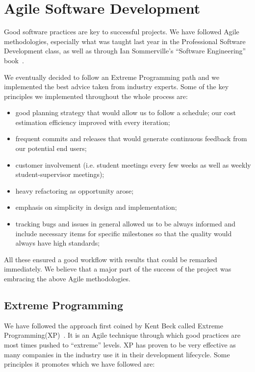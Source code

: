 \documentclass{l4proj}
\begin{document}

\chapter{Agile Software Development}
\label{agile-software-development}

Good software practices are key to successful projects. We have followed Agile methodologies, especially what was
taught last year in the Professional Software Development class, as well as through Ian Sommerville's ``Software
Engineering'' book~\cite{software-engineering}.

We eventually decided to follow an Extreme Programming path and we implemented the best advice taken from industry
experts. Some of the key principles we implemented throughout the whole process are:
\begin{itemize}
    \item good planning strategy that would allow us to follow a schedule; our cost estimation efficiency improved
      with every iteration;
    \item frequent commits and releases that would generate continuous feedback from our potential end users;
    \item customer involvement (i.e. student meetings every few weeks as well as weekly student-supervisor
      meetings);
    \item heavy refactoring as opportunity arose;
    \item emphasis on simplicity in design and implementation;
    \item tracking bugs and issues in general allowed us to be always informed and include necessary items for
      specific milestones so that the quality would always have high standards;
\end{itemize}

All these ensured a good workflow with results that could be remarked immediately. We believe that a major part of the
success of the project was embracing the above Agile methodologies.

\section{Extreme Programming}

We have followed the approach first coined by Kent Beck called Extreme Programming(XP)~\cite{extreme-programming}. It is an
Agile technique through which good practices are most times pushed to ``extreme'' levels. XP has proven to be very effective as many companies in the industry use it in their development lifecycle. Some principles it promotes which we have followed are:
\end{document}
